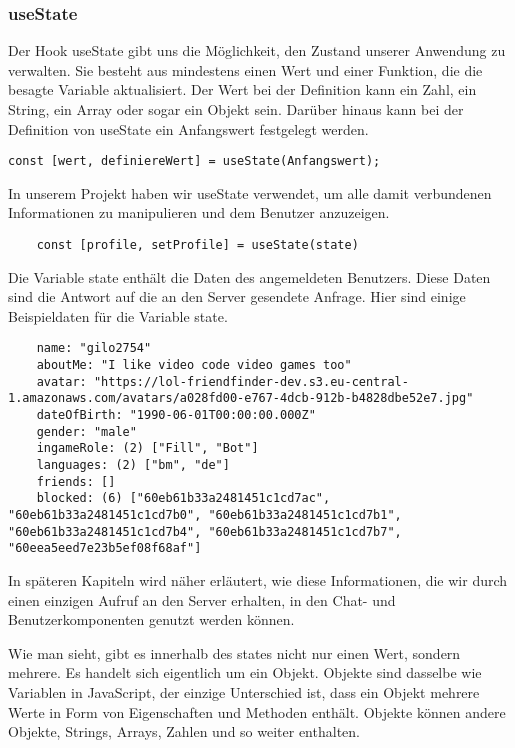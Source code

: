 \subsubsection{useState}
Der Hook useState gibt uns die Möglichkeit, den Zustand unserer Anwendung zu verwalten. Sie besteht aus mindestens einen Wert und einer Funktion, die die besagte Variable aktualisiert.
Der Wert bei der Definition kann ein Zahl, ein String, ein Array oder sogar ein Objekt sein.
Darüber hinaus kann bei der Definition von useState ein Anfangswert festgelegt werden.

\begin{lstlisting}
const [wert, definiereWert] = useState(Anfangswert);
\end{lstlisting}

In unserem Projekt haben wir useState verwendet, um alle damit verbundenen Informationen zu manipulieren und dem Benutzer anzuzeigen.
\begin{lstlisting}
    const [profile, setProfile] = useState(state)    
    \end{lstlisting}

\newpage
Die Variable state enthält die Daten des angemeldeten Benutzers. Diese Daten sind die Antwort auf die an den Server gesendete Anfrage. 
Hier sind einige Beispieldaten für die Variable state.

\begin{lstlisting}
    name: "gilo2754"
    aboutMe: "I like video code video games too"
    avatar: "https://lol-friendfinder-dev.s3.eu-central-1.amazonaws.com/avatars/a028fd00-e767-4dcb-912b-b4828dbe52e7.jpg"
    dateOfBirth: "1990-06-01T00:00:00.000Z"
    gender: "male"
    ingameRole: (2) ["Fill", "Bot"]
    languages: (2) ["bm", "de"]
    friends: []
    blocked: (6) ["60eb61b33a2481451c1cd7ac", "60eb61b33a2481451c1cd7b0", "60eb61b33a2481451c1cd7b1", "60eb61b33a2481451c1cd7b4", "60eb61b33a2481451c1cd7b7", "60eea5eed7e23b5ef08f68af"]
\end{lstlisting}
In späteren Kapiteln wird näher erläutert, wie diese Informationen, die wir durch einen einzigen Aufruf an den Server erhalten, in den Chat- und Benutzerkomponenten genutzt werden können. 

Wie man sieht, gibt es innerhalb des states nicht nur einen Wert, sondern mehrere.
Es handelt sich eigentlich um ein Objekt. Objekte sind dasselbe wie Variablen in JavaScript, der einzige Unterschied ist, dass ein Objekt mehrere Werte in Form von Eigenschaften und Methoden enthält.
Objekte können andere Objekte, Strings, Arrays, Zahlen und so weiter enthalten.
\newpage

